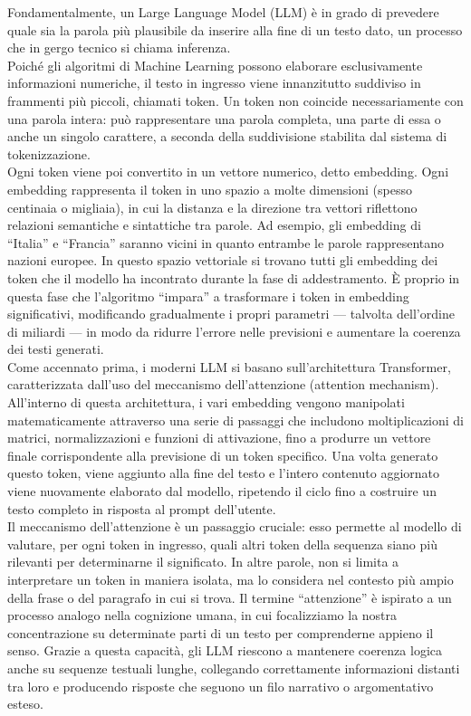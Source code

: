 Fondamentalmente, un Large Language Model (LLM) è in grado di prevedere quale sia la parola più plausibile da inserire alla fine di un testo dato, un processo che in gergo tecnico si chiama inferenza. \\
Poiché gli algoritmi di Machine Learning possono elaborare esclusivamente informazioni numeriche, il testo in ingresso viene innanzitutto suddiviso in frammenti più piccoli, chiamati token. Un token non coincide necessariamente con una parola intera: può rappresentare una parola completa, una parte di essa o anche un singolo carattere, a seconda della suddivisione stabilita dal sistema di tokenizzazione. \\
Ogni token viene poi convertito in un vettore numerico, detto embedding. Ogni embedding rappresenta il token in uno spazio a molte dimensioni (spesso centinaia o migliaia), in cui la distanza e la direzione tra vettori riflettono relazioni semantiche e sintattiche tra parole. Ad esempio, gli embedding di “Italia” e “Francia” saranno vicini in quanto entrambe le parole rappresentano nazioni europee. In questo spazio vettoriale si trovano tutti gli embedding dei token che il modello ha incontrato durante la fase di addestramento. È proprio in questa fase che l’algoritmo “impara” a trasformare i token in embedding significativi, modificando gradualmente i propri parametri — talvolta dell’ordine di miliardi — in modo da ridurre l’errore nelle previsioni e aumentare la coerenza dei testi generati. \\
Come accennato prima, i moderni LLM si basano sull’architettura Transformer, caratterizzata dall’uso del meccanismo dell’attenzione (attention mechanism). All’interno di questa architettura, i vari embedding vengono manipolati matematicamente attraverso una serie di passaggi che includono moltiplicazioni di matrici, normalizzazioni e funzioni di attivazione, fino a produrre un vettore finale corrispondente alla previsione di un token specifico. Una volta generato questo token, viene aggiunto alla fine del testo e l’intero contenuto aggiornato viene nuovamente elaborato dal modello, ripetendo il ciclo fino a costruire un testo completo in risposta al prompt dell’utente. \\
Il meccanismo dell’attenzione è un passaggio cruciale: esso permette al modello di valutare, per ogni token in ingresso, quali altri token della sequenza siano più rilevanti per determinarne il significato. In altre parole, non si limita a interpretare un token in maniera isolata, ma lo considera nel contesto più ampio della frase o del paragrafo in cui si trova. Il termine “attenzione” è ispirato a un processo analogo nella cognizione umana, in cui focalizziamo la nostra concentrazione su determinate parti di un testo per comprenderne appieno il senso. Grazie a questa capacità, gli LLM riescono a mantenere coerenza logica anche su sequenze testuali lunghe, collegando correttamente informazioni distanti tra loro e producendo risposte che seguono un filo narrativo o argomentativo esteso. \\
